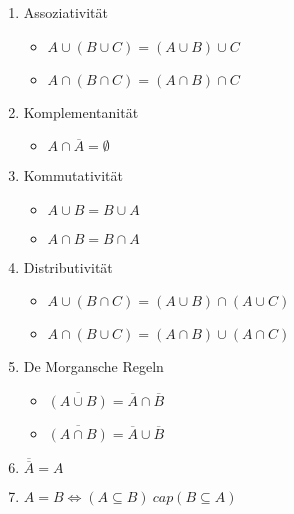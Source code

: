 \documentclass{../../meta/tudscript}
\begin{document}
\begin{enumerate}
\def\labelenumi{\arabic{enumi}.}

\item
  Assoziativität

  \begin{itemize}
  
  \item
    \(A \cup (B \cup C) = (A \cup B) \cup C\)
  \item
    \(A \cap (B \cap C) = (A \cap B) \cap C\)
  \end{itemize}
\item
  Komplementanität

  \begin{itemize}
  
  \item
    \(A \cap \overline{A} = \emptyset\)
  \end{itemize}
\item
  Kommutativität

  \begin{itemize}
  
  \item
    \(A \cup B = B \cup A\)
  \item
    \(A \cap B = B \cap A\)
  \end{itemize}
\item
  Distributivität

  \begin{itemize}
  
  \item
    \(A \cup (B \cap C) = (A \cup B) \cap (A \cup C)\)
  \item
    \(A \cap (B \cup C) = (A \cap B) \cup (A \cap C)\)
  \end{itemize}
\item
  De Morgansche Regeln

  \begin{itemize}
  
  \item
    \(\overline{(A \cup B)} = \overline{A} \cap \overline{B}\)
  \item
    \(\overline{(A \cap B)} = \overline{A} \cup \overline{B}\)
  \end{itemize}
\item
  \(\overline{\overline{A}} = A\)
\item
  \(A = B \iff (A \subseteq B) \ cap (B \subseteq A)\)
\end{enumerate}

\end{document}
